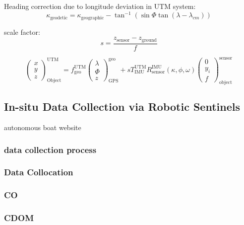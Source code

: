 Heading correction due to longitude deviation in UTM system:
\begin{equation}
  \kappa_{\text{geodetic}} = \kappa_{\text{geographic}}-\tan^{-1}\left( \sin\Phi \tan(\lambda-\lambda_{cm}) \right)
\end{equation}

scale factor:
\begin{equation}
  s = \frac{z_{\text{sensor}}-z_{\text{ground}}}{f}
\end{equation}

\begin{equation}
  \begin{pmatrix}
    x \\ y \\ z
  \end{pmatrix}_{\text{Object}}^{\text{UTM}} =
  f_{\text{geo}}^{\text{UTM}}\begin{pmatrix}
    \lambda \\
    \Phi \\
    z
  \end{pmatrix}_{\text{GPS}}^{\text{geo}} + sT_{\text{IMU}}^{\text{UTM}}R_{\text{sensor}}^{\text{IMU}}(\kappa, \phi, \omega)\begin{pmatrix}
    0 \\
    y_i \\
    f
  \end{pmatrix}_{\text{object}}^{\text{sensor}}
\end{equation}




\subsection{In-situ Data Collection via Robotic Sentinels}

autonomous boat website \cite{Otter}


\subsubsection{data collection process}
\subsubsection{Data Collocation}

\subsubsection{CO}
\subsubsection{CDOM}
